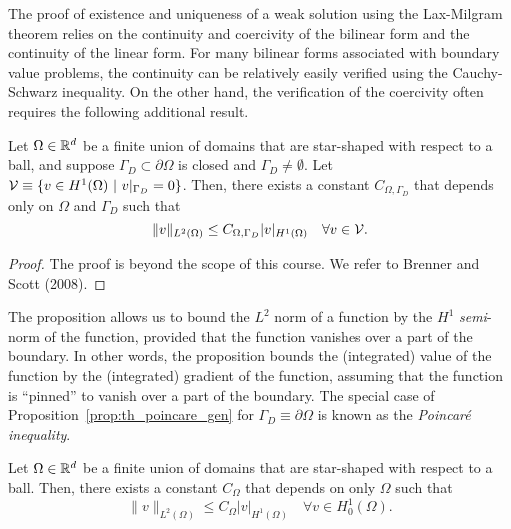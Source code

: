 The proof of existence and uniqueness of a weak solution using the Lax-Milgram theorem relies on the continuity and coercivity of the bilinear form and the continuity of the linear form.  %
For many bilinear forms associated with boundary value problems, the continuity can be relatively easily verified using the Cauchy-Schwarz inequality.  On the other hand, the verification of the coercivity often requires the following additional result.
\begin{proposition}
  \label{prop:th_poincare_gen}
  Let $\Omega \in \mathbb{R}^d$ be a finite union of domains that are star-shaped with respect to a ball, and suppose $\Gamma_D \subset \partial \Omega$ is closed and $\Gamma_D \neq \emptyset$.  Let $\mathcal{V} \equiv \{ v \in H^1(\Omega) \ | \ v|_{\Gamma_D} = 0 \}$.  Then, there exists a constant $C_{\Omega,\Gamma_D}$ that depends only on $\Omega$ and $\Gamma_D$ such that
  \begin{equation*}
    \| v \|_{L^2(\Omega)} \leq C_{\Omega,\Gamma_D} | v |_{H^1(\Omega)} \quad \forall v \in \mathcal{V}.
  \end{equation*}
    \begin{proof}
      The proof is beyond the scope of this course.  We refer to Brenner and Scott (2008).
    \end{proof}
\end{proposition}
The proposition allows us to bound the $L^2$ norm of a function by the $H^1$ \emph{semi}-norm of the function, provided that the function vanishes over a part of the boundary.  In other words, the proposition bounds the (integrated) value of the function by the (integrated) gradient of the function, assuming that the function is ``pinned'' to vanish over a part of the boundary.
The special case of Proposition~\ref{prop:th_poincare_gen} for $\Gamma_D \equiv \partial \Omega$ is known as the \emph{Poincar\'e inequality}.
\begin{proposition}
  \label{prop:poincare}
  Let $\Omega \in \mathbb{R}^d$ be a finite union of domains that are star-shaped with respect to a ball. Then, there exists a constant $C_\Omega$ that depends on only $\Omega$ such that
  \begin{equation*}
    \| v \|_{L^2(\Omega)} \leq C_\Omega | v |_{H^1(\Omega)} \quad \forall v \in H^1_0(\Omega).
  \end{equation*}
\end{proposition}

